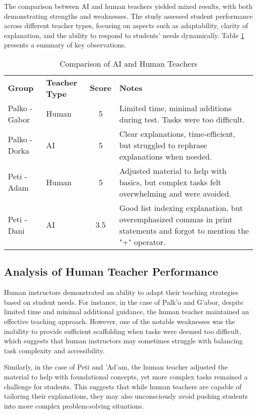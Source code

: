 \documentclass[12pt]{article}  %
\begin{document}
The comparison between AI and human teachers yielded mixed results, with both demonstrating strengths and weaknesses. The study assessed student performance across different teacher types, focusing on aspects such as adaptability, clarity of explanation, and the ability to respond to students’ needs dynamically. Table \ref{tab:comparison} presents a summary of key observations.

\begin{table}[h]
\centering
\renewcommand{\arraystretch}{1.3}
\begin{tabular}{l l c p{7cm}}
\textbf{Group} & \textbf{Teacher Type} & \textbf{Score} & \textbf{Notes} \\
Palko - Gabor & Human & 5 & Limited time, minimal additions during test. Tasks were too difficult. \\
Palko - Dorka & AI & 5 & Clear explanations, time-efficient, but struggled to rephrase explanations when needed. \\
Peti - Adam & Human & 5 & Adjusted material to help with basics, but complex tasks felt overwhelming and were avoided. \\
Peti - Dani & AI & 3.5 & Good list indexing explanation, but overemphasized commas in print statements and forgot to mention the "+" operator. \\
\end{tabular}
\caption{Comparison of AI and Human Teachers}
\label{tab:comparison}
\end{table}

\subsection{Analysis of Human Teacher Performance}
Human instructors demonstrated an ability to adapt their teaching strategies based on student needs. For instance, in the case of Palk'o and G'abor, despite limited time and minimal additional guidance, the human teacher maintained an effective teaching approach. However, one of the notable weaknesses was the inability to provide sufficient scaffolding when tasks were deemed too difficult, which suggests that human instructors may sometimes struggle with balancing task complexity and accessibility.

Similarly, in the case of Peti and 'Ad'am, the human teacher adjusted the material to help with foundational concepts, yet more complex tasks remained a challenge for students. This suggests that while human teachers are capable of tailoring their explanations, they may also unconsciously avoid pushing students into more complex problem-solving situations.
\end{document}
